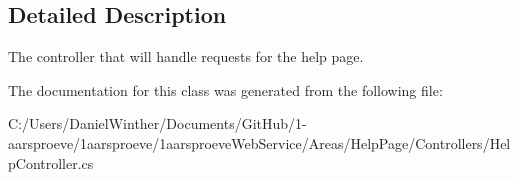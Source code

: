 \subsection{Detailed Description}
The controller that will handle requests for the help page. 



The documentation for this class was generated from the following file\+:\begin{DoxyCompactItemize}
\item 
C\+:/\+Users/\+Daniel\+Winther/\+Documents/\+Git\+Hub/1-\/aarsproeve/1aarsproeve/1aarsproeve\+Web\+Service/\+Areas/\+Help\+Page/\+Controllers/Help\+Controller.\+cs\end{DoxyCompactItemize}
